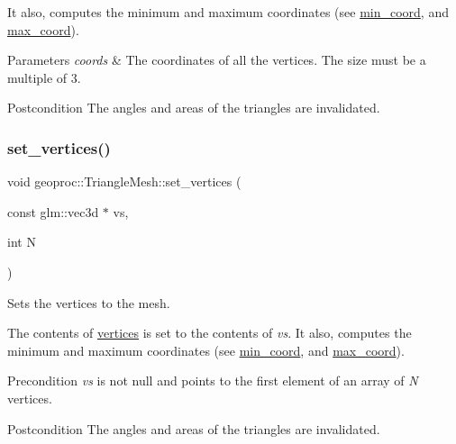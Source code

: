 It also, computes the minimum and maximum coordinates (see \hyperlink{classgeoproc_1_1TriangleMesh_abbde1dd2f3c76af9fe3b5bca764c8827}{min\+\_\+coord}, and \hyperlink{classgeoproc_1_1TriangleMesh_ae51ba387921e2be00c7608a73ea7498c}{max\+\_\+coord}). 
\begin{DoxyParams}{Parameters}
{\em coords} & The coordinates of all the vertices. The size must be a multiple of 3.\\
\hline
\end{DoxyParams}
\begin{DoxyPostcond}{Postcondition}
The angles and areas of the triangles are invalidated. 
\end{DoxyPostcond}
\mbox{\label{classgeoproc_1_1TriangleMesh_a6a22ba5b1e8dcf735c104fa03b01f7ae}} 
\subsubsection{\texorpdfstring{set\+\_\+vertices()}{set\_vertices()}\hspace{0.1cm}{\footnotesize\ttfamily [2/3]}}
{\footnotesize\ttfamily void geoproc\+::\+Triangle\+Mesh\+::set\+\_\+vertices (\begin{DoxyParamCaption}\item[{const glm\+::vec3d $\ast$}]{vs,  }\item[{int}]{N }\end{DoxyParamCaption})}



Sets the vertices to the mesh. 

The contents of \hyperlink{classgeoproc_1_1TriangleMesh_a72052fc497d349c48966b937e5e3e834}{vertices} is set to the contents of {\itshape vs}. It also, computes the minimum and maximum coordinates (see \hyperlink{classgeoproc_1_1TriangleMesh_abbde1dd2f3c76af9fe3b5bca764c8827}{min\+\_\+coord}, and \hyperlink{classgeoproc_1_1TriangleMesh_ae51ba387921e2be00c7608a73ea7498c}{max\+\_\+coord}). \begin{DoxyPrecond}{Precondition}
{\itshape vs} is not null and points to the first element of an array of {\itshape N} vertices.
\end{DoxyPrecond}
\begin{DoxyPostcond}{Postcondition}
The angles and areas of the triangles are invalidated. 
\end{DoxyPostcond}
\mbox{\label{classgeoproc_1_1TriangleMesh_a8ec1bd0a9ff539251ee3750eedc694b3}} 
